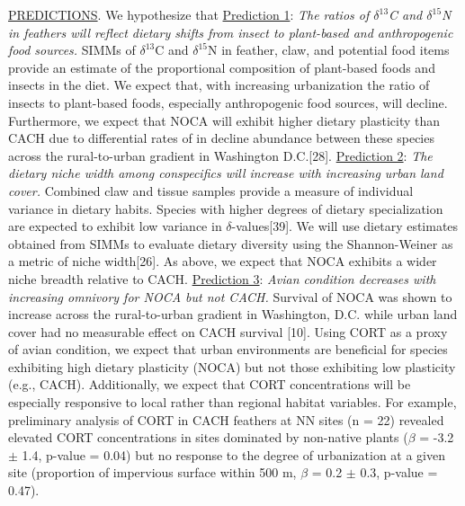 \documentclass[12pt]{article}
\begin{document}
\noindent \underline{PREDICTIONS}. We hypothesize that  \underline{Prediction 1}: \textit{The ratios of $\delta^{13}$C and $\delta^{15}$N in feathers will reflect dietary shifts from insect to plant-based and anthropogenic food sources.}  SIMMs of $\delta^{13}$C and  $\delta^{15}$N in feather, claw, and potential food items provide an estimate of the proportional composition of plant-based foods and insects in the diet. We expect that, with increasing urbanization the ratio of insects to plant-based foods, especially anthropogenic food sources, will decline. Furthermore, we expect that NOCA will exhibit higher dietary plasticity than CACH due to differential rates of in decline abundance between these species across the rural-to-urban gradient in Washington D.C.[28]. \underline{Prediction 2}: \textit{The dietary niche width among conspecifics will increase with increasing urban land cover.} Combined claw and tissue samples provide a measure of individual variance in dietary habits. Species with higher degrees of dietary specialization are expected to exhibit low variance in $\delta$-values[39]. We will use dietary estimates obtained from SIMMs to evaluate dietary diversity using the Shannon-Weiner as a metric of niche width[26]. As above, we expect that NOCA exhibits a wider niche breadth relative to CACH. \underline{Prediction 3}: \textit{Avian condition decreases with increasing omnivory for NOCA but not CACH.} Survival of NOCA was shown to increase across the rural-to-urban gradient in Washington, D.C. while urban land cover had no measurable effect on CACH survival [10]. Using CORT as a proxy of avian condition, we expect that urban environments are beneficial for species exhibiting high dietary plasticity (NOCA) but not those exhibiting low plasticity (e.g., CACH). Additionally, we expect that CORT concentrations will be especially responsive to local rather than regional habitat variables. For example, preliminary analysis of CORT in CACH feathers at NN sites (n = 22) revealed elevated CORT concentrations in sites dominated by non-native plants ($\beta$ = -3.2 $\pm$ 1.4, p-value = 0.04) but no response to the degree of urbanization at a given site (proportion of impervious surface within 500 m, $\beta$ = 0.2 $\pm$ 0.3, p-value = 0.47). 

\end{document}
